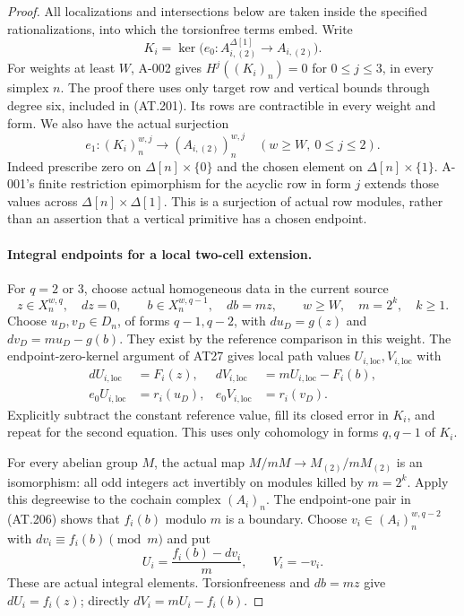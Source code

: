 \begin{proof}
All localizations and intersections below are taken inside the
specified rationalizations, into which the torsionfree terms embed.
Write
\[
 K_i=\ker\bigl(e_0:A_{i,(2)}^{\Delta[1]}\longrightarrow A_{i,(2)}\bigr).
 \tag{AT.203}
\]
For weights at least $W$, A-002 gives $H^j((K_i)_n)=0$
for $0\leq j\leq3$, in every simplex $n$.
The proof there uses only target row and vertical bounds through
degree six, included in \textup{(AT.201)}.
Its rows are contractible in every weight and form.
We also have the actual surjection
\[
                  e_1:(K_i)_n^{w,j}\longrightarrow
                          (A_{i,(2)})_n^{w,j}
       \quad (w\geq W,\ 0\leq j\leq2).
 \tag{AT.204}
\]
Indeed prescribe zero on $\Delta[n]\times\{0\}$ and the chosen
element on $\Delta[n]\times\{1\}$. A-001's finite restriction
epimorphism for the acyclic row in form $j$ extends those values
across $\Delta[n]\times\Delta[1]$.
This is a surjection of actual row modules, rather than an assertion
that a vertical primitive has a chosen endpoint.

\paragraph{Integral endpoints for a local two-cell extension.}
For $q=2$ or $3$, choose actual homogeneous data in the current source
\[
 z\in X_n^{w,q},\quad dz=0,\qquad
 b\in X_n^{w,q-1},\quad db=mz,
 \qquad w\geq W,\quad m=2^k,\quad k\geq1.
 \tag{AT.205}
\]
Choose $u_D,v_D\in D_n$, of forms $q-1,q-2$, with
$du_D=g(z)$ and $dv_D=mu_D-g(b)$.
They exist by the reference comparison in this weight.
The endpoint-zero-kernel argument of AT27 gives local path values
$U_{i,\mathrm{loc}},V_{i,\mathrm{loc}}$ with
\[
 \begin{aligned}
 dU_{i,\mathrm{loc}}&=F_i(z),&
 dV_{i,\mathrm{loc}}&=mU_{i,\mathrm{loc}}-F_i(b),\\
 e_0U_{i,\mathrm{loc}}&=r_i(u_D),&
 e_0V_{i,\mathrm{loc}}&=r_i(v_D).
 \end{aligned}
 \tag{AT.206}
\]
Explicitly subtract the constant reference value, fill its closed
error in $K_i$, and repeat for the second equation. This uses only
cohomology in forms $q,q-1$ of $K_i$.

For every abelian group $M$, the actual map
$M/mM\to M_{(2)}/mM_{(2)}$ is an isomorphism: all odd integers
act invertibly on modules killed by $m=2^k$.
Apply this degreewise to the cochain complex $(A_i)_n$.
The endpoint-one pair in \textup{(AT.206)} shows that $f_i(b)$
modulo $m$ is a boundary. Choose $v_i\in(A_i)_n^{w,q-2}$
with $dv_i\equiv f_i(b)\pmod m$ and put
\[
             U_i=\frac{f_i(b)-dv_i}{m},\qquad V_i=-v_i.
 \tag{AT.207}
\]
These are actual integral elements. Torsionfreeness and $db=mz$
give $dU_i=f_i(z)$; directly $dV_i=mU_i-f_i(b)$.


\end{proof}
